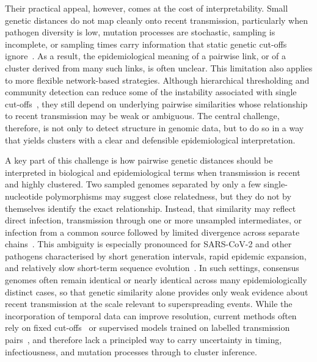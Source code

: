 \documentclass[10pt,letterpaper]{article}
\begin{document}
Their practical appeal, however, comes at the cost of interpretability. Small genetic distances do not map cleanly onto recent transmission, particularly when pathogen diversity is low, mutation processes are stochastic, sampling is incomplete, or sampling times carry information that static genetic cut-offs ignore~\cite{Poon2016, Campbell2018a, Valesano2021, Bendall2022, Sobkowiak2023}. As a result, the epidemiological meaning of a pairwise link, or of a cluster derived from many such links, is often unclear. This limitation also applies to more flexible network-based strategies. Although hierarchical thresholding and community detection can reduce some of the instability associated with single cut-offs~\cite{Liu2023, Chiu2022}, they still depend on underlying pairwise similarities whose relationship to recent transmission may be weak or ambiguous. The central challenge, therefore, is not only to detect structure in genomic data, but to do so in a way that yields clusters with a clear and defensible epidemiological interpretation.

A key part of this challenge is how pairwise genetic distances should be interpreted in biological and epidemiological terms when transmission is recent and highly clustered. Two sampled genomes separated by only a few single-nucleotide polymorphisms may suggest close relatedness, but they do not by themselves identify the exact relationship. Instead, that similarity may reflect direct infection, transmission through one or more unsampled intermediates, or infection from a common source followed by limited divergence across separate chains~\cite{Louca2021}. This ambiguity is especially pronounced for SARS-CoV-2 and other pathogens characterised by short generation intervals, rapid epidemic expansion, and relatively slow short-term sequence evolution~\cite{Louca2021, Farjo2023, GallegoGarca2022, Bendall2022, Campbell2018a}. In such settings, consensus genomes often remain identical or nearly identical across many epidemiologically distinct cases, so that genetic similarity alone provides only weak evidence about recent transmission at the scale relevant to superspreading events. While the incorporation of temporal data can improve resolution, current methods often rely on fixed cut-offs~\cite{dor2025} or supervised models trained on labelled transmission pairs~\cite{Sobkowiak2022}, and therefore lack a principled way to carry uncertainty in timing, infectiousness, and mutation processes through to cluster inference.
\end{document}
